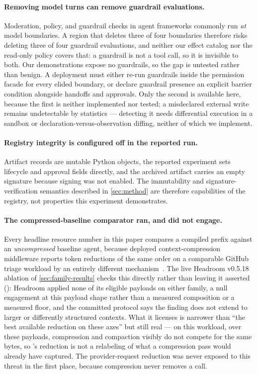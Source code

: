 \paragraph{Removing model turns can remove guardrail evaluations.}
Moderation, policy, and guardrail checks in agent frameworks commonly run \emph{at} model
boundaries.  A region that deletes three of four boundaries therefore risks deleting three of
four guardrail evaluations, and neither our effect catalog nor the read-only policy covers
that: a guardrail is not a tool call, so it is invisible to both.  Our demonstrations expose
no guardrails, so the gap is untested rather than benign.  A deployment must either re-run
guardrails inside the permission facade for every elided boundary, or declare guardrail
presence an explicit barrier condition alongside handoffs and approvals.  Only the second
is available here, because the first is neither implemented nor tested; a misdeclared external
write remains undetectable by statistics --- detecting it needs differential execution in a
sandbox or declaration-versus-observation diffing, neither of which we implement.

\paragraph{Registry integrity is configured off in the reported run.}
Artifact records are mutable Python objects, the reported experiment sets lifecycle and
approval fields directly, and the archived artifact carries an empty signature because
signing was not enabled.  The immutability and signature-verification semantics described
in \cref{sec:method} are therefore capabilities of the registry, not properties this
experiment demonstrates.

\paragraph{The compressed-baseline comparator ran, and did not engage.}
Every headline resource number in this paper compares a compiled prefix against an
\emph{uncompressed} baseline agent, because deployed context\hyp{}compression middleware
reports token reductions of the same order on a comparable GitHub triage workload by an
entirely different mechanism~\cite{headroom2026}.  The live Headroom v0.5.18 ablation of
\cref{sec:family-results} checks this directly rather than leaving it asserted
(): Headroom applied none of its
eligible payloads on either family, a null engagement at this payload shape rather than a
measured composition or a measured floor, and the committed protocol says the finding does
not extend to larger or differently structured contexts.  What it licenses is narrower
than ``the best available reduction on these axes'' but still real --- on this workload,
over these payloads, compression and compaction visibly do not compete for the same
bytes, so \method's reduction is not a relabeling of what a compression pass would already
have captured.  The provider-request reduction was never exposed to this threat in the
first place, because compression never removes a call.


